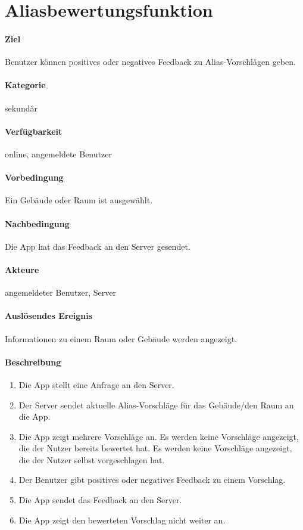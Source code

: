 \section{Aliasbewertungsfunktion}
\label{Aliasbewertungsfunktion}
\paragraph{Ziel}
Benutzer können positives oder negatives Feedback zu Alias-Vorschlägen geben.
\paragraph{Kategorie}
sekundär
\paragraph{Verfügbarkeit}
online, angemeldete Benutzer
\paragraph{Vorbedingung}
Ein Gebäude oder Raum ist ausgewählt.
\paragraph{Nachbedingung}
Die App hat das Feedback an den Server gesendet.
\paragraph{Akteure}
angemeldeter Benutzer, Server
\paragraph{Auslösendes Ereignis}
Informationen zu einem Raum oder Gebäude werden angezeigt.
\paragraph{Beschreibung}
\begin{enumerate}
    \item Die App stellt eine Anfrage an den Server.
    \item Der Server sendet aktuelle Alias-Vorschläge für das Gebäude/den Raum an die App.
    \item Die App zeigt mehrere Vorschläge an. Es werden keine Vorschläge angezeigt, die der Nutzer bereits bewertet hat. Es werden keine Vorschläge angezeigt, die der Nutzer selbst vorgeschlagen hat.
    \item Der Benutzer gibt positives oder negatives Feedback zu einem Vorschlag.
    \item Die App sendet das Feedback an den Server.
    \item Die App zeigt den bewerteten Vorschlag nicht weiter an.
\end{enumerate}